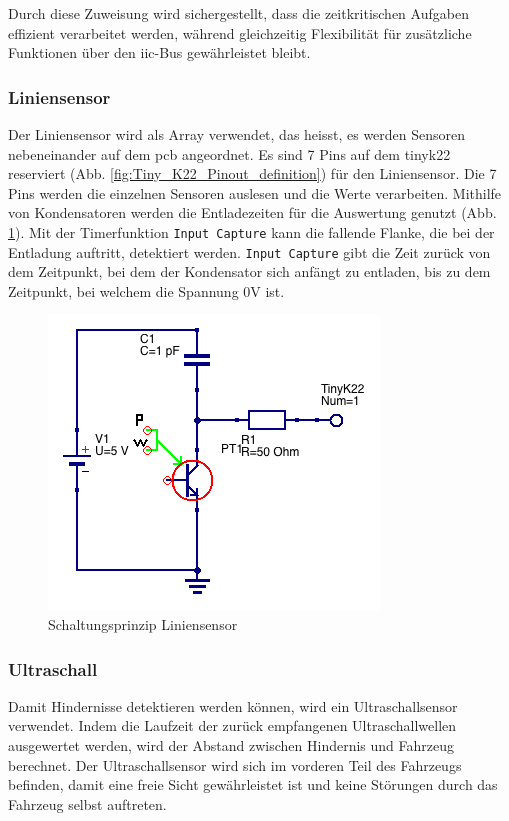 Durch diese Zuweisung wird sichergestellt, dass die zeitkritischen Aufgaben effizient verarbeitet werden, während gleichzeitig Flexibilität für zusätzliche Funktionen über den \acrshort{iic}-Bus gewährleistet bleibt.


\subsubsection*{Liniensensor}


Der Liniensensor wird als Array verwendet, das heisst, es werden Sensoren nebeneinander auf dem \acrshort{pcb} angeordnet. Es sind 7 Pins auf dem \gls{tinyk22} reserviert (Abb. \ref{fig:Tiny_K22_Pinout_definition}) für den Liniensensor. Die 7 Pins werden die einzelnen Sensoren auslesen und die Werte verarbeiten. Mithilfe von Kondensatoren werden die Entladezeiten für die Auswertung genutzt (Abb. \ref{fig:Liniensensor_Schaltung}). Mit der Timerfunktion \verb|Input Capture| kann die fallende Flanke, die bei der Entladung auftritt, detektiert werden. \verb|Input Capture| gibt die Zeit zurück von dem Zeitpunkt, bei dem der Kondensator sich anfängt zu entladen, bis zu dem Zeitpunkt, bei welchem die Spannung 0V ist.

\begin{figure}[H]
    \centering
    \includegraphics[width=0.4\linewidth]{img/Liniensensor_Schaltung.png}
    \caption{Schaltungsprinzip Liniensensor}
    \label{fig:Liniensensor_Schaltung}
\end{figure}

\subsubsection*{Ultraschall}


Damit Hindernisse detektieren werden können, wird ein Ultraschallsensor verwendet. Indem die Laufzeit der zurück empfangenen Ultraschallwellen ausgewertet werden, wird der Abstand zwischen Hindernis und Fahrzeug berechnet. Der Ultraschallsensor wird sich im vorderen Teil des Fahrzeugs befinden, damit eine freie Sicht gewährleistet ist und keine Störungen durch das Fahrzeug selbst auftreten.


